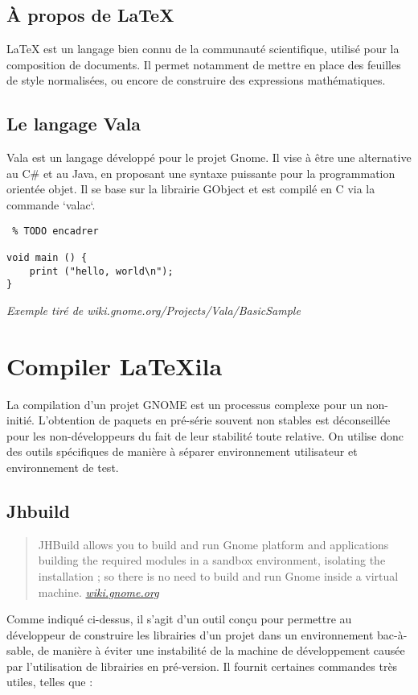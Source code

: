 \documentclass[a4paper,11pt]{report}
\begin{document}
\subsection{À propos de \LaTeX}
LaTeX est un langage bien connu de la communauté scientifique, utilisé pour la composition de documents. Il permet notamment de mettre en place des feuilles de style normalisées, ou encore de construire des expressions mathématiques.

\subsection{Le langage Vala}
\label{sub:vala}
Vala est un langage développé pour le projet Gnome. Il vise à être une alternative au C\# et au Java, en proposant une syntaxe puissante pour la programmation orientée objet. Il se base sur la librairie GObject et est compilé en C via la commande `valac`.
\begin{lstlisting} % TODO encadrer

void main () {
    print ("hello, world\n");
}

\end{lstlisting}\textit{Exemple tiré de wiki.gnome.org/Projects/Vala/BasicSample}

\section{Compiler LaTeXila}
\label{cha:compiler}
La compilation d'un projet GNOME est un processus complexe pour un non-initié. L'obtention de paquets en pré-série souvent non stables est déconseillée pour les non-développeurs du fait de leur stabilité toute relative. On utilise donc des outils spécifiques de manière à séparer environnement utilisateur et environnement de test. 

\subsection{Jhbuild}
\label{sub:jhbuild}

\begin{quote}
JHBuild allows you to build and run Gnome platform and applications building the required modules in a sandbox environment, isolating the installation ; so there is no need to build and run Gnome inside a virtual machine. \textit{\url{wiki.gnome.org}}
\end{quote}

Comme indiqué ci-dessus, il s'agit d'un outil conçu pour permettre au développeur de construire les librairies d'un projet dans un environnement bac-à-sable, de manière à éviter une instabilité de la machine de développement causée par l'utilisation de librairies en pré-version. Il fournit certaines commandes très utiles, telles que :
\end{document}
